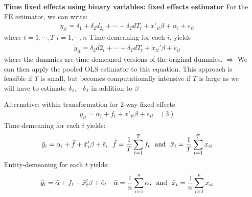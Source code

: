 \documentclass[a4paper,twoside,11pt]{article}
\begin{document}
\begin{shaded}
\noindent \textbf{Time fixed effects using binary variables: fixed effects estimator}
\newline
For the FE estimator, we can write:
\begin{equation*}
\begin{aligned}
y_{it} = \delta_1 + \delta_2 d_{2_t} + \cdots + \delta_T dT_t + x'_{it} \beta + \alpha_i + e_{it}
\end{aligned}
\end{equation*}
where $t=1,\cdots, T$  $i=1,\cdots, n$
\newline
\newline
Time-demeaning for each $i$, yields
\begin{equation*}
\begin{aligned}
\ddot y_{it} = \delta_2 d \ddot{2}_t + \cdots + \delta_T d \ddot T_t + \ddot x_{it}' \beta + \ddot e_{it}
\end{aligned}
\end{equation*}
where the dummies are time-demeaned versions of the original dummies.
$\Rightarrow$ We can then apply the pooled OLS estimator to this equation.
\newline
\newline
This approach is feasible if $T$ is small, but becomes computationally intensive if $T$ is large as we will have to estimate $\delta_2, \cdots \delta_T$ in addition to $\beta$
\end{shaded}
\noindent \textcolor{NavyBlue}{Alternative: within transformation for 2-way fixed effects}
\begin{equation*}
\begin{aligned}
y_{it} = \alpha_i + f_t + x'_{it} \beta + e_{it} \ \ \ \ (3)
\end{aligned}
\end{equation*}
Time-demeaning for each $i$ yields:
\begin{equation*}
\begin{aligned}
\bar y_i = \alpha_i +  \bar f + \bar x_i' \beta + \bar e_i \ \ \bar f = \frac{1}{T} \sum^T_{t=1} f_t \ \ \textmd{and} \ \ \bar x_i = \frac{1}{T} \sum^T_{t=1} x_{it} 
\end{aligned}
\end{equation*}
Entity-demeaning for each $t$ yields:
\begin{equation*}
\begin{aligned}
\bar y_t = \bar \alpha + f_t + \bar x_t' \beta + \bar e_t \ \ \ \bar \alpha = \frac{1}{n} \sum^n_{i=1} \alpha_i \ \ \textmd{and} \ \ \bar x_t = \frac{1}{n}\sum^n_{i=1} x_{it}
\end{aligned}
\end{equation*}
\end{document}
